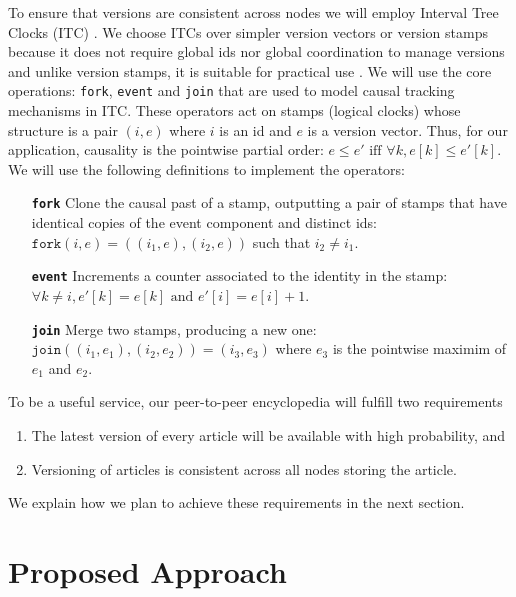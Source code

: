 \documentclass{article}
\begin{document}
To ensure that versions are consistent across nodes we will employ Interval Tree
Clocks (ITC) \cite{abf08}. We choose ITCs over simpler version vectors \cite{ppr83}
or version stamps \cite{abf02} because it does not require global ids nor global
coordination to manage versions and unlike version stamps, it is suitable for
practical use \cite{abf07}. We will use the core operations: \texttt{fork},
\texttt{event} and \texttt{join} that are used to model causal tracking mechanisms
in ITC. These operators act on stamps (logical clocks) whose structure is a pair
$(i,e)$ where $i$ is an id and $e$ is a version vector. Thus, for our application,
causality is the pointwise partial order: $e \leq e' \textrm{ iff } \forall{k}, e[k] \leq e'[k]$.
We will use the following definitions to implement the operators:

\begin{itemize}
  \item[\textbf{\texttt{fork}}] Clone the causal past of a stamp, outputting a pair of stamps that
  have identical copies of the event component and distinct ids:
  $\texttt{fork}(i,e) = \left((i_{1},e),(i_{2},e)\right)$ such that $i_{2} \ne i_{1}$.

  \item[\textbf{\texttt{event}}] Increments a counter associated to the identity in the stamp:
  $\forall{k} \ne i, e'[k] = e[k] \textrm{ and } e'[i] = e[i] + 1$.

  \item[\textbf{\texttt{join}}] Merge two stamps, producing a new one:
  $\texttt{join}\left((i_{1},e_{1}),(i_{2},e_{2})\right) = (i_{3},e_{3})$ where $e_{3}$
  is the pointwise maximim of $e_{1}$ and $e_{2}$.
\end{itemize}

\noindent
To be a useful service, our peer-to-peer encyclopedia will fulfill two requirements
\begin{enumerate}[
  labelindent=\parindent,
  style=multiline,
  leftmargin=*,
  label=(SG\arabic*)
]
  \item The latest version of every article will be available with high probability, and
  \item Versioning of articles is consistent across all nodes storing the article.
\end{enumerate}

\noindent
We explain how we plan to achieve these requirements in the next section.

\section{Proposed Approach}
\end{document}
